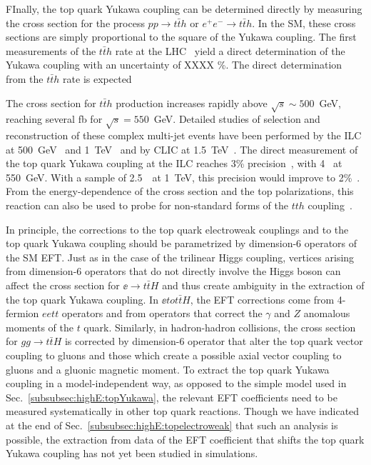  FInally, the top quark Yukawa coupling can be determined directly by
 measuring the cross section for the process $pp \rightarrow t\bar{t}h$ or
$e^+e^- \rightarrow t\bar{t}h$.  In the SM, these cross sections are simply
proportional to the square of the Yukawa coupling. The first measurements
of the $t\bar{t}h$ rate at the LHC~\cite{} yield a direct determination of 
the Yukawa coupling with an uncertainty of XXXX \%. The direct determination
from the $t\bar{t}h$ rate is expected

The cross 
section for $t\bar{t}h$ production increases rapidly above $\sqrt{s} \sim 500 $~GeV,
reaching several fb for $\sqrt{s} = 550$~GeV. Detailed studies of
selection
 and reconstruction of these complex multi-jet events
have been performed by the ILC at 500~GeV~\cite{Yonamine:2011jg} and
 1~TeV~\cite{Behnke:2013lya,Price:2014oca} and by CLIC
at 1.5~TeV~\cite{Abramowicz:2018rjq}. The direct measurement of the
top
 quark Yukawa coupling at the ILC reaches 3\%
precision~\cite{Fujii:2015jha}, with 4~\iab{} at 550~GeV.  With a sample of
2.5~\iab\  at 
1~TeV, this precision would improve to 2\%~\cite{Asner:2013psa}.  From
the energy-dependence of the cross section and the top polarizations,
this reaction can also be used to probe for non-standard forms of the
$tth$ coupling~\cite{Han:1999xd}.

In principle, the corrections to the top quark electroweak couplings
and to the top quark Yukawa coupling should be parametrized by
dimension-6 operators of the SM EFT.   Just as in the case of the
trilinear Higgs coupling, vertices arising from dimension-6 operators
that do not directly involve the Higgs boson can affect the cross
section for $\ee\to t\bar t H$ and thus create ambiguity in the
extraction of the top quark Yukawa coupling.   In $\ee to t\bar t H$,
the EFT corrections come from 4-fermion $eett$ operators and from
operators that correct the $\gamma$ and $Z$ anomalous moments of the
$t$ quark.   Similarly, in hadron-hadron collisions, the cross section
for $gg\to t\bar t H$ is corrected by dimension-6 operator that alter
the top quark vector coupling to gluons and those which create a
possible axial vector coupling to gluons and a gluonic magnetic
moment.  To extract the top quark Yukawa coupling in a
model-independent way, as opposed to the simple model used in
Sec.~\ref{subsubsec:highE:topYukawa}, the relevant EFT coefficients
need to be measured systematically in other top quark reactions.
Though we have indicated at the end of
Sec.~\ref{subsubsec:highE:topelectroweak} that such an analysis is
possible, the extraction from data of the EFT coefficient that shifts
the top quark Yukawa coupling has not yet been studied in simulations.